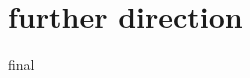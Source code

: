\documentclass[10pt,journal,compsoc]{IEEEtran}
\begin{document}
\section{further direction}final
%
%



%
%
\end{document}
